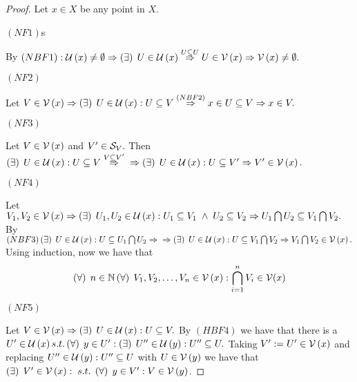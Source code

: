 \documentclass[a4paper,12pt]{report}
\newcommand{\nbh}[1]
{
\cg{V}\left(#1\right)
}
\newcommand{\nbhb}[1]
{
\cg{U}\left(#1\right)
}
\begin{document}
\begin{proof}
\sufficiency

Let $x\in X$ be any point in $X$.

\begin{center}
$\left(NF1\right)$s
\end{center}
By $\left(NBF1\right): \nbhb{x} \neq \emptyset \Rightarrow \fe{\exists} U \in \nbhb{x} \overset{U\subseteq U}{\Rightarrow} U\in\nbh{x} \Rightarrow \nbh{x} \neq \emptyset.$

\begin{center}
$\left(NF2\right)$
\end{center}

Let $V\in \nbh{x} \Rightarrow \fe{\exists} U \in \nbhb{x}: U\subseteq V \overset{\left(NBF2\right)}{\Rightarrow} x\in U\subseteq V \Rightarrow x\in V. $

\begin{center}
$\left(NF3\right)$
\end{center}

Let $V\in \nbh{x} $ and $V'\in \mathcal{S}_V.$ Then $\fe{\exists} U\in\nbhb{x}: U\subseteq V \overset{V\subseteq V'}{\Rightarrow} \\ \Rightarrow \fe{\exists} U\in\nbhb{x}: U\subseteq V' \Rightarrow V'\in\nbh{x}.$

\begin{center}
$\left(NF4\right)$
\end{center}

Let $V_1,V_2 \in \nbh{x} \Rightarrow \fe{\exists} U_1,U_2 \in \nbhb{x}: U_1 \subseteq V_1 \;\land \; U_2\subseteq V_2 \\ \Rightarrow U_1\bigcap U_2\subseteq V_1\bigcap V_2.$ By $\left(NBF3\right) \fe{\exists} U\in\nbhb{x}: U\subseteq U_1\bigcap U_2 \Rightarrow \\ \Rightarrow \fe{\exists} U \in\nbhb{x}: U\subseteq V_1\bigcap V_2 \Rightarrow V_1\bigcap V_2 \in\nbh{x}.$\\
Using induction, now we have that $$\fe{\forall} n\in\mathbb{N} \fe{\forall} V_1,V_2,\dots ,V_n \in \nbh{x}: \displaystyle\bigcap_{i = 1}^n V_i \in \mathcal{V}(x) $$

\begin{center}
$\left(NF5\right)$
\end{center}

Let $V \in \nbh{x} \Rightarrow \fe{\exists} U\in \nbhb{x}: U \subseteq V.$ By $(HBF4)$ we have that there is a $U' \in \nbhb{x} s.t. \fe{\forall} y\in U': \fe{\exists} U'' \in \nbhb{y}: U''\subseteq U.$ Taking $V' := U'\in\nbh{x}$ and replacing $U''\in\nbhb{y}: U''\subseteq U$ with $U\in\nbh{y}$ we have that $\fe{\exists} V' \in\nbh{x}: \;s.t.\; \fe{\forall} y\in V': V\in\nbh{y}$.

\end{proof}
\end{document}
